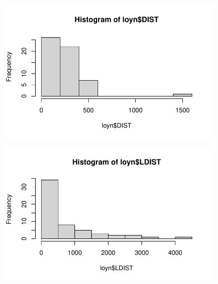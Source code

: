 \documentclass[
  10pt,
  letterpaper,
  DIV=11,
  numbers=noendperiod]{scrartcl}
\newenvironment{Shaded}{\begin{snugshade}}{\end{snugshade}}
\newcommand{\FunctionTok}[1]{\textcolor[rgb]{0.28,0.35,0.67}{#1}}
\newcommand{\NormalTok}[1]{\textcolor[rgb]{0.00,0.23,0.31}{#1}}
\newcommand{\SpecialCharTok}[1]{\textcolor[rgb]{0.37,0.37,0.37}{#1}}
\begin{document}
\begin{Shaded}
\end{Shaded}

\begin{figure}[H]

{\centering \includegraphics{ENVX2001-2024-Lab07_files/figure-pdf/unnamed-chunk-2-6.pdf}

}

\end{figure}

\begin{Shaded}
\end{Shaded}

\begin{figure}[H]

{\centering \includegraphics{ENVX2001-2024-Lab07_files/figure-pdf/unnamed-chunk-2-7.pdf}

}

\end{figure}
\end{document}
